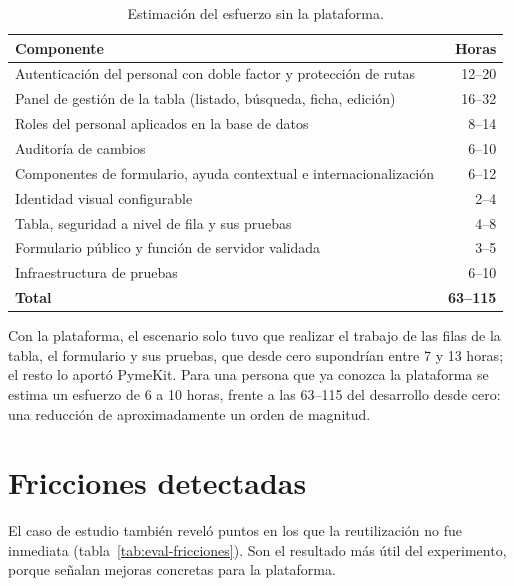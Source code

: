 \begin{table}[htbp]
  \centering
  \footnotesize
  \caption{Estimación del esfuerzo sin la plataforma.}
  \label{tab:eval-estimacion}
  \begin{tabularx}{\textwidth}{@{}Xr@{}}
    \toprule
    \textbf{Componente} & \textbf{Horas} \\
    \midrule
    Autenticación del personal con doble factor y protección de rutas & 12--20 \\
    Panel de gestión de la tabla (listado, búsqueda, ficha, edición) & 16--32 \\
    Roles del personal aplicados en la base de datos & 8--14 \\
    Auditoría de cambios & 6--10 \\
    Componentes de formulario, ayuda contextual e internacionalización & 6--12 \\
    Identidad visual configurable & 2--4 \\
    Tabla, seguridad a nivel de fila y sus pruebas & 4--8 \\
    Formulario público y función de servidor validada & 3--5 \\
    Infraestructura de pruebas & 6--10 \\
    \midrule
    \textbf{Total} & \textbf{63--115} \\
    \bottomrule
  \end{tabularx}
\end{table}

Con la plataforma, el escenario solo tuvo que realizar el trabajo de las
filas de la tabla, el formulario y sus pruebas, que desde cero supondrían
entre 7 y 13 horas; el resto lo aportó PymeKit. Para una persona que ya
conozca la plataforma se estima un esfuerzo de 6 a 10 horas, frente a las
63--115 del desarrollo desde cero: una reducción de aproximadamente un orden
de magnitud.

\section{Fricciones detectadas}
\label{sec:eval-fricciones}

El caso de estudio también reveló puntos en los que la reutilización no fue
inmediata (tabla~\ref{tab:eval-fricciones}). Son el resultado más útil del
experimento, porque señalan mejoras concretas para la plataforma.

